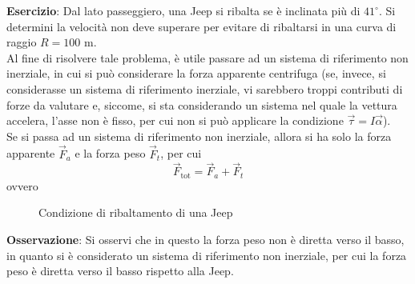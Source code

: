 \documentclass[a4paper]{extarticle}
\begin{document}
\vspace{1em}
\noindent
\textbf{Esercizio}: Dal lato passeggiero, una Jeep si ribalta se è inclinata più di $41^\circ$. Si determini la velocità non deve superare per evitare di ribaltarsi in una curva di raggio $R=100$ m.\\
Al fine di risolvere tale problema, è utile passare ad un sistema di riferimento non inerziale, in cui si può considerare la forza apparente centrifuga (se, invece, si considerasse un sistema di riferimento inerziale, vi sarebbero troppi contributi di forze da valutare e, siccome, si sta considerando un sistema nel quale la vettura accelera, l'asse non è fisso, per cui non si può applicare la condizione $\vec \tau = I \vec \alpha$).\\
Se si passa ad un sistema di riferimento non inerziale, allora si ha solo la forza apparente $\vec F_a$ e la forza peso $\vec F_t$, per cui
\[\vec F_{\text{tot}} = \vec F_a + \vec F_t\]
ovvero

\vspace{1em}
\noindent
\begin{figure}[H]
  \centering
  \newcommand{\ang}{30}

  \caption{Condizione di ribaltamento di una Jeep}
  \label{fig:piano_inclinato_2}
\end{figure}

\vspace{1em}
\noindent
\textbf{Osservazione}: Si osservi che in questo la forza peso non è diretta verso il basso, in quanto si è considerato un sistema di riferimento non inerziale, per cui la forza peso è diretta verso il basso rispetto alla Jeep.
\end{document}
